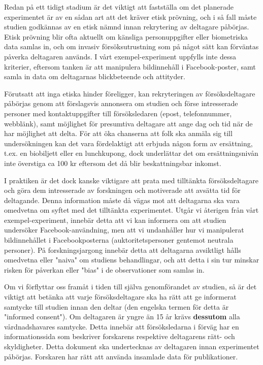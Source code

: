 \documentclass[
]{book}
\begin{document}
Redan på ett tidigt stadium är det viktigt att fastställa om det planerade experimentet är av en sådan art att det kräver etisk prövning, och i så fall måste studien godkännas av en etisk nämnd innan rekrytering av deltagare påbörjas. Etisk prövning blir ofta aktuellt om känsliga personuppgifter eller biometriska data samlas in, och om invasiv försöksutrustning som på något sätt kan förväntas påverka deltagaren används. I vårt exempel-experiment uppfylls inte dessa kriterier, eftersom tanken är att manipulera bildinnehåll i Facebook-poster, samt samla in data om deltagarnas blickbeteende och attityder.

Förutsatt att inga etiska hinder föreligger, kan rekryteringen av försöksdeltagare påbörjas genom att förslagsvis annonsera om studien och förse intresserade personer med kontaktuppgifter till försöksledaren (epost, telefonnummer, webblänk), samt möjlighet för presumtiva deltagare att ange dag och tid när de har möjlighet att delta. För att öka chanserna att folk ska anmäla sig till undersökningen kan det vara fördelaktigt att erbjuda någon form av ersättning, t.ex. en biobiljett eller en lunchkupong, dock underlättar det om ersättningsnivån inte överstiga ca 100 kr eftersom det då blir beskattningsbar inkomst.

I praktiken är det dock kanske viktigare att prata med tilltänkta försöksdeltagare och göra dem intresserade av forskningen och motiverade att avsätta tid för deltagande. Denna information måste då vägas mot att deltagarna ska vara omedvetna om syftet med det tilltänkta experimentet. Utgår vi återigen från vårt exempel-experiment, innebär detta att vi kan informera om att studien undersöker Facebook-användning, men att vi undanhåller hur vi manipulerat bildinnehållet i Facebookposterna (auktoritetspersoner gentemot neutrala personer). På forskningsjargong innebär detta att deltagarna avsiktligt hålls omedvetna eller "naiva" om studiens behandlingar, och att detta i sin tur minskar risken för påverkan eller "bias" i de observationer som samlas in.

Om vi förflyttar oss framåt i tiden till själva genomförandet av studien, så är det viktigt att betänka att varje försöksdeltagare ska ha rätt att ge informerat samtycke till studien innan den deltar (den engelska termen för detta är "informed consent"). Om deltagaren är yngre än 15 år krävs \textbf{dessutom} alla vårdnadshavares samtycke. Detta innebär att försöksledarna i förväg har en informationssida som beskriver forskarens respektive deltagarens rätt- och skyldigheter. Detta dokument ska undertecknas av deltagaren innan experimentet påbörjas. Forskaren har rätt att använda insamlade data för publikationer.
\end{document}
